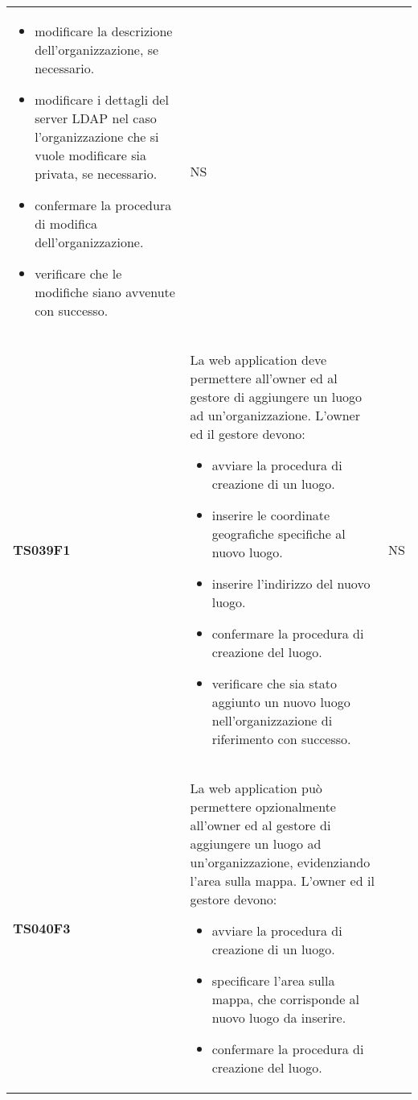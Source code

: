 \documentclass[../piano-di-qualifica.tex]{subfiles}
\begin{document}
\begin{longtable}[H]{>{\centering\bfseries}m{3cm} >{}m{10cm} >{\centering\arraybackslash}m{3cm}}
\begin{itemize}
    \item modificare la descrizione dell'organizzazione, se necessario.
    \item modificare i dettagli del server LDAP nel caso l'organizzazione che si vuole modificare sia privata, se necessario.
    \item confermare la procedura di modifica dell'organizzazione.
    \item verificare che le modifiche siano avvenute con successo.
  \end{itemize}
                     & NS                                                                                                                                                                                                                                                               \\
  TS039F1            & La web application deve permettere all'owner ed al gestore di aggiungere un luogo ad un'organizzazione. \newline
  L'owner ed il gestore devono:
  \begin{itemize}
    \item avviare la procedura di creazione di un luogo.
    \item inserire le coordinate geografiche specifiche al nuovo luogo.
    \item inserire l'indirizzo del nuovo luogo.
    \item confermare la procedura di creazione del luogo.
    \item verificare che sia stato aggiunto un nuovo luogo nell'organizzazione di riferimento con successo.
  \end{itemize}
                     & NS                                                                                                                                                                                                                                                               \\
  TS040F3            & La web application può permettere opzionalmente all'owner ed al gestore di aggiungere un luogo ad un'organizzazione, evidenziando l'area sulla mappa. \newline
  L'owner ed il gestore devono:
  \begin{itemize}
    \item avviare la procedura di creazione di un luogo.
    \item specificare l'area sulla mappa, che corrisponde al nuovo luogo da inserire.
    \item confermare la procedura di creazione del luogo.

\end{itemize}
\end{longtable}
\end{document}
